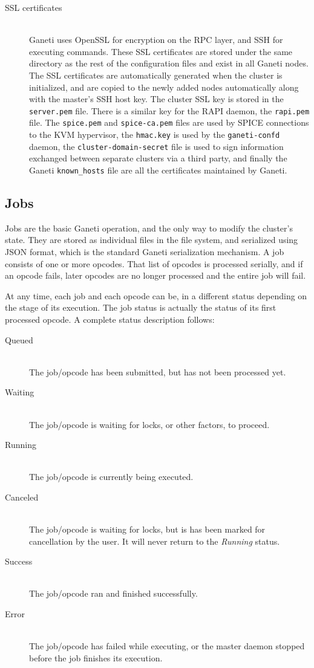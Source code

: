 \begin{description}
  \item[SSL certificates] \hfill \\
  Ganeti uses OpenSSL for encryption on the RPC layer, and SSH for executing
  commands. These SSL certificates are stored under the same directory as the
  rest of the configuration files and exist in all Ganeti nodes. The SSL
  certificates are automatically generated when the cluster is initialized, and
  are copied to the newly added nodes automatically along with the master's SSH
  host key. The cluster SSL key is stored in the \texttt{server.pem} file.
  There is a similar key for the RAPI daemon, the \texttt{rapi.pem} file. The
  \texttt{spice.pem} and \texttt{spice-ca.pem} files are used by SPICE
  connections to the KVM hypervisor, the \texttt{hmac.key} is used by the
  \texttt{ganeti-confd} daemon, the \texttt{cluster-domain-secret} file is used
  to sign information exchanged between separate clusters via a third party,
  and finally the Ganeti \texttt{known\_hosts} file are all the certificates
  maintained by Ganeti.
\end{description}

\subsection{Jobs}\label{subsec:jobs}

Jobs are the basic Ganeti operation, and the only way to modify the cluster's
state. They are stored as individual files in the file system, and serialized
using JSON format, which is the standard Ganeti serialization mechanism. A
job consists of one or more opcodes. That list of opcodes is processed
serially, and if an opcode fails, later opcodes are no longer processed and
the entire job will fail.

At any time, each job and each opcode can be, in a different status depending
on the stage of its execution. The job status is actually the status of its
first processed opcode. A complete status description follows:
\begin{description}
  \item[Queued] \hfill \\
    The job/opcode has been submitted, but has not been processed yet.
  \item[Waiting] \hfill \\
    The job/opcode is waiting for locks, or other factors, to proceed.
  \item[Running] \hfill \\
    The job/opcode is currently being executed.
  \item[Canceled] \hfill \\
    The job/opcode is waiting for locks, but is has been marked for
    cancellation by the user. It will never return to the \emph{Running}
    status.
  \item[Success] \hfill \\
    The job/opcode ran and finished successfully.
  \item[Error] \hfill \\
    The job/opcode has failed while executing, or the master daemon stopped
    before the job finishes its execution.
\end{description}

